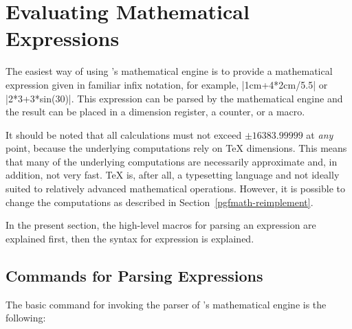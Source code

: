 %
%
%
%

\section{Evaluating Mathematical Expressions}

The easiest way of using \pgfname's mathematical engine is to provide
a mathematical expression given in familiar infix notation, for
example, |1cm+4*2cm/5.5| or |2*3+3*sin(30)|. This expression can be
parsed by the mathematical engine and the result can be placed in a
dimension register, a counter, or a macro.

It should be noted that all
calculations must not exceed $\pm16383.99999$ at \emph{any} point,
because the underlying computations rely on \TeX{} dimensions. This
means that many of the underlying computations are necessarily
approximate and, in addition, not very fast. \TeX{} is,
after all, a typesetting language and not ideally
suited to relatively advanced mathematical operations. However, it
is possible to change the computations as described in
Section~\ref{pgfmath-reimplement}.

In the present section, the high-level macros for parsing an
expression are explained first, then the syntax for expression is
explained.


\subsection{Commands for Parsing Expressions}

\label{pgfmath-registers}

\label{pgfmath-parsing}

The basic command for invoking the parser of \pgfname's mathematical
engine is the following:

